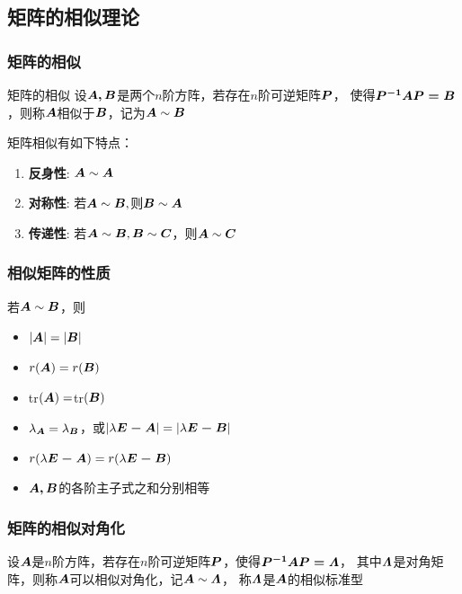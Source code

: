 \documentclass[12pt, a4paper, oneside, UTF8]{ctexbook}
\begin{document}
\subsection{矩阵的相似理论}
\subsubsection{矩阵的相似}
\begin{defn}{矩阵的相似}{}
    设$\boldsymbol{A, B}$是两个$n$阶方阵，若存在$n$阶可逆矩阵$\boldsymbol{P}$， 使得$\boldsymbol{P^{-1}AP=B}$，则称$\boldsymbol{A}$相似于$\boldsymbol{B}$，记为$\boldsymbol{A}\sim\boldsymbol{B}$
\end{defn}

矩阵相似有如下特点：
\begin{enumerate}[leftmargin=4em]
    \item \textbf{反身性}: $\boldsymbol{A}\sim\boldsymbol{A}$
    \item \textbf{对称性}: 若$\boldsymbol{A}\sim\boldsymbol{B}, $则$\boldsymbol{B}\sim\boldsymbol{A}$
    \item \textbf{传递性}: 若$\boldsymbol{A}\sim\boldsymbol{B}, \boldsymbol{B}\sim\boldsymbol{C}$，则$\boldsymbol{A}\sim\boldsymbol{C}$
\end{enumerate}
\subsubsection{相似矩阵的性质}
若$\boldsymbol{A}\sim\boldsymbol{B}$，则
\begin{multicols}{2}
\begin{itemize}[leftmargin=4em]
    \item $|\boldsymbol{A}|=|\boldsymbol{B}|$
    \item $r(\boldsymbol{A})=r(\boldsymbol{B})$
    \item tr$(\boldsymbol{A})=$tr$(\boldsymbol{B})$
    \item $\lambda_{\boldsymbol{A}}=\lambda_{\boldsymbol{B}}$，或$|\lambda\boldsymbol{E-A}|=|\lambda\boldsymbol{E-B}|$
    \item $r(\lambda\boldsymbol{E-A})=r(\lambda\boldsymbol{E-B})$
    \item $\boldsymbol{A, B}$的各阶主子式之和分别相等
\end{itemize}
\end{multicols}
\subsubsection{矩阵的相似对角化}
\begin{defn}{}{}
    设$\boldsymbol{A}$是$n$阶方阵，若存在$n$阶可逆矩阵$\boldsymbol{P}$，使得$\boldsymbol{P^{-1}AP=\varLambda }$， 其中$\boldsymbol{\varLambda}$是对角矩阵，则称$\boldsymbol{A}$可以相似对角化，记$\boldsymbol{A}\sim\boldsymbol{\varLambda}$， 称$\boldsymbol{\varLambda}$是$\boldsymbol{A}$的相似标准型
\end{defn}
\end{document}
